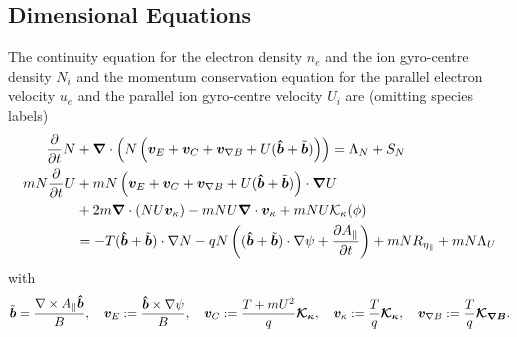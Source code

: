 \subsection{Dimensional Equations}
The continuity equation for the electron density \(n_e\) and the ion gyro-centre
density \(N_i\) and the momentum conservation equation for
the parallel electron velocity \(u_e\) and the parallel ion gyro-centre velocity \(U_i\) are
(omitting species labels)~\cite{WiesenbergerPhD, HeldPhD}
\begin{align}
\frac{\partial}{\partial t} N &+ {\boldsymbol{\nabla}}\cdot\left( N \left(
    {\boldsymbol{v}}_E + {\boldsymbol{v}}_C + {\boldsymbol{v}}_{\nabla B} + U(\bm{\hat{b}} + \tilde{{\boldsymbol{b}}})\right)\right) = \Lambda_N + S_N \\
mN \frac{\partial}{\partial t} U &+ mN \left(
    {\boldsymbol{v}}_E + {\boldsymbol{v}}_C + {\boldsymbol{v}}_{\nabla B} + U(\bm{\hat{b}} + \tilde{{\boldsymbol{b}}})
    \right)\cdot {\boldsymbol{\nabla}} U  \nonumber \\
    &+ 2m{\boldsymbol{\nabla}} \cdot ( NU {\boldsymbol{v}}_\kappa)
    -mNU{\boldsymbol{\nabla}}\cdot {\boldsymbol{v}}_\kappa
    + mNU\mathcal K_\kappa(\phi) \nonumber\\
    &= -T (\bm{\hat{b}} + \tilde{{\boldsymbol{b}}})\cdot \nabla N -qN \left( (\bm{\hat{b}}+\tilde{{\boldsymbol{b}}})\cdot \nabla \psi + \frac{\partial A_\parallel}{\partial t}\right) + mN R_{\eta_\parallel} + mN\Lambda_U
\label{}
\end{align}
with
\begin{align}
\tilde{{\boldsymbol{b}}} = \frac{\nabla\times A_\parallel \bm{\hat{b}}}{B}, \quad
{\boldsymbol{v}}_E := \frac{\bm{\hat{b}}\times\nabla\psi}{B},\quad
{\boldsymbol{v}}_C := \frac{T+mU^2}{q}{\boldsymbol{\mathcal K_\kappa}},\quad
{\boldsymbol{v}}_\kappa := \frac{T}{q}{\boldsymbol{\mathcal K_\kappa}},\quad
{\boldsymbol{v}}_{\nabla B} := \frac{T}{q}{\boldsymbol{\mathcal K_{\nabla B}}}.
\label{}
\end{align}

